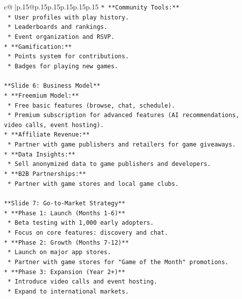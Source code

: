 \documentclass{article}
\begin{document}
{\begin{supertabular}{c@{$\;$}|p{.15\linewidth}@{}p{.15\linewidth}p{.15\linewidth}p{.15\linewidth}p{.15\linewidth}p{.15\linewidth}}
{{{\texttt{*   **Community Tools:**} \\
\texttt{    *   User profiles with play history.} \\
\texttt{    *   Leaderboards and rankings.} \\
\texttt{    *   Event organization and RSVP.} \\
\texttt{*   **Gamification:**} \\
\texttt{    *   Points system for contributions.} \\
\texttt{    *   Badges for playing new games.} \\
\\ 
\texttt{**Slide 6: Business Model**} \\
\texttt{*   **Freemium Model:**} \\
\texttt{    *   Free basic features (browse, chat, schedule).} \\
\texttt{    *   Premium subscription for advanced features (AI recommendations, video calls, event hosting).} \\
\texttt{*   **Affiliate Revenue:**} \\
\texttt{    *   Partner with game publishers and retailers for game giveaways.} \\
\texttt{*   **Data Insights:**} \\
\texttt{    *   Sell anonymized data to game publishers and developers.} \\
\texttt{*   **B2B Partnerships:**} \\
\texttt{    *   Partner with game stores and local game clubs.} \\
\\ 
\texttt{**Slide 7: Go{-}to{-}Market Strategy**} \\
\texttt{*   **Phase 1: Launch (Months 1{-}6)**} \\
\texttt{    *   Beta testing with 1,000 early adopters.} \\
\texttt{    *   Focus on core features: discovery and chat.} \\
\texttt{*   **Phase 2: Growth (Months 7{-}12)**} \\
\texttt{    *   Launch on major app stores.} \\
\texttt{    *   Partner with game stores for "Game of the Month" promotions.} \\
\texttt{*   **Phase 3: Expansion (Year 2+)**} \\
\texttt{    *   Introduce video calls and event hosting.} \\
\texttt{    *   Expand to international markets.} \\
}}}
\end{supertabular}}
\end{document}
